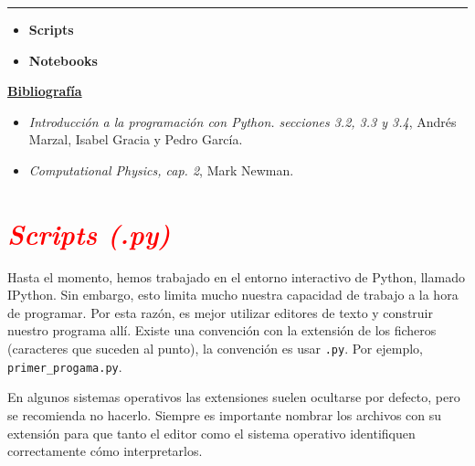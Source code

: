 \documentclass[12pt]{article}
\begin{document}
		\thispagestyle{firstpage}
		\vspace*{1.5cm}
	
	\begin{center}
		\rule{\textwidth}{0.4pt}
	\end{center}
	
	\begin{itemize}[leftmargin=*,label=\textcolor{red}{\ensuremath{\blacktriangleright}}]
		\item \textbf{Scripts}
		\item \textbf{Notebooks}
	\end{itemize}
	
	\noindent
	\textbf{\underline{Bibliografía}}
	\begin{itemize}[leftmargin=*, label={\textcolor{blue}{$\bullet$}}]
		\item \textit{Introducción a la programación con Python. secciones 3.2, 3.3 y 3.4}, Andrés Marzal, Isabel Gracia y Pedro García.
		\item \textit{Computational Physics, cap. 2}, Mark Newman.
	\end{itemize}
     
    

\section*{\textcolor{red}{\textit{Scripts (.py)}}}
	Hasta el momento, hemos trabajado en el entorno interactivo de Python, llamado IPython.
    Sin embargo, esto limita mucho nuestra capacidad de trabajo a la hora de programar. Por esta 
    razón, es mejor utilizar editores de texto y construir nuestro programa allí. Existe una convención con 
    la extensión de los ficheros (caracteres que suceden al punto), la convención es usar 
    \lstinline|.py|. Por ejemplo, \lstinline|primer_progama.py|. 
    
    En algunos sistemas operativos las extensiones suelen ocultarse por defecto, pero se recomienda 
    no hacerlo. Siempre es importante nombrar los archivos con su extensión para que tanto el editor 
    como el sistema operativo identifiquen correctamente cómo interpretarlos.  
\end{document}
